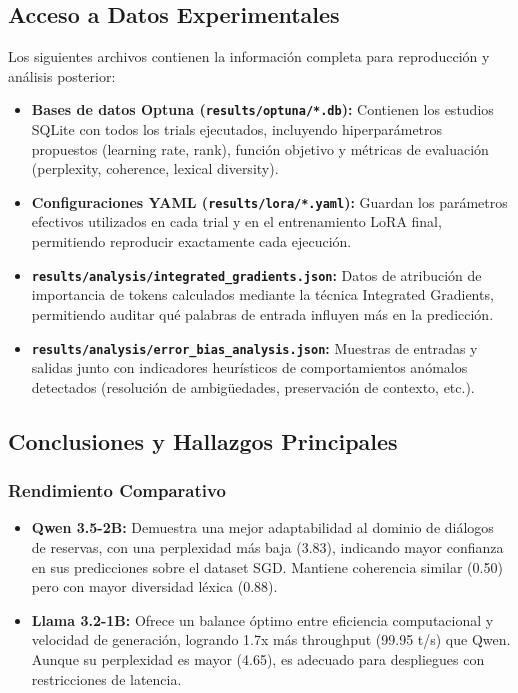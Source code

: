 \subsection{Acceso a Datos Experimentales}

Los siguientes archivos contienen la información completa para reproducción y análisis posterior:

\begin{itemize}
    \item \textbf{Bases de datos Optuna (\texttt{results/optuna/*.db}):} Contienen los estudios SQLite con todos los trials ejecutados, incluyendo hiperparámetros propuestos (learning rate, rank), función objetivo y métricas de evaluación (perplexity, coherence, lexical diversity).
    \item \textbf{Configuraciones YAML (\texttt{results/lora/*.yaml}):} Guardan los parámetros efectivos utilizados en cada trial y en el entrenamiento LoRA final, permitiendo reproducir exactamente cada ejecución.
    \item \textbf{\texttt{results/analysis/integrated\_gradients.json}:} Datos de atribución de importancia de tokens calculados mediante la técnica Integrated Gradients, permitiendo auditar qué palabras de entrada influyen más en la predicción.
    \item \textbf{\texttt{results/analysis/error\_bias\_analysis.json}:} Muestras de entradas y salidas junto con indicadores heurísticos de comportamientos anómalos detectados (resolución de ambigüedades, preservación de contexto, etc.).
\end{itemize}

\subsection{Conclusiones y Hallazgos Principales}

\subsubsection{Rendimiento Comparativo}

\begin{itemize}
    \item \textbf{Qwen 3.5-2B:} Demuestra una mejor adaptabilidad al dominio de diálogos de reservas, con una perplexidad más baja (3.83), indicando mayor confianza en sus predicciones sobre el dataset SGD. Mantiene coherencia similar (0.50) pero con mayor diversidad léxica (0.88).
    \item \textbf{Llama 3.2-1B:} Ofrece un balance óptimo entre eficiencia computacional y velocidad de generación, logrando 1.7x más throughput (99.95 t/s) que Qwen. Aunque su perplexidad es mayor (4.65), es adecuado para despliegues con restricciones de latencia.
\end{itemize}

